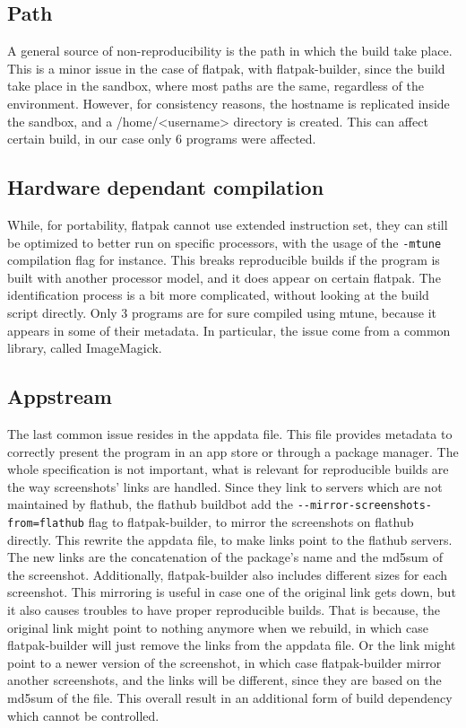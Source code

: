 \documentclass[a4paper,11pt,oneside]{report}
\theoremstyle{definition}
\newcommand{\rb}{reproducible builds\xspace}
\newcommand{\fp}{flatpak\xspace}
\newcommand{\fh}{flathub\xspace}
\newcommand{\fb}{flatpak-builder\xspace}
\newcommand{\fhbb}{flathub buildbot\xspace}
\begin{document}
\subsection*{Path}
A general source of non-reproducibility is the path in which the build take
place. This is a minor issue in the case of \fp, with \fb, since the build take
place in the sandbox, where most paths are the same, regardless of the
environment. However, for consistency reasons, the hostname is replicated
inside the sandbox, and a /home/<username> directory is created. This can
affect certain build, in our case only 6 programs were affected.

\subsection*{Hardware dependant compilation}
While, for portability, \fp cannot use extended instruction set, they can still
be optimized to better run on specific processors, with the usage of the
\verb|-mtune| compilation flag for instance. This breaks \rb if the program is
built with another processor model, and it does appear on certain \fp. The
identification process is a bit more complicated, without looking at the build
script directly. Only 3 programs are for sure compiled using mtune, because it
appears in some of their metadata. In particular, the issue come from a common
library, called ImageMagick.

\subsection*{Appstream}
The last common issue resides in the appdata file. This file provides metadata
to correctly present the program in an app store or through a package manager.
The whole specification is not important, what is relevant for \rb are the way
screenshots' links are handled. Since they link to servers which are not
maintained by \fh, the \fhbb add the \verb|--mirror-screenshots-from=flathub|
flag to \fb, to mirror the screenshots on \fh directly. This rewrite the
appdata file, to make links point to the \fh servers. The new links are the
concatenation of the package's name and the md5sum of the screenshot.
Additionally, \fb also includes different sizes for each screenshot. This
mirroring is useful in case one of the original link gets down, but it also
causes troubles to have proper \rb. That is because, the original link might
point to nothing anymore when we rebuild, in which case \fb will just remove
the links from the appdata file. Or the link might point to a newer version of
the screenshot, in which case \fb mirror another screenshots, and the links
will be different, since they are based on the md5sum of the file. This overall
result in an additional form of build dependency which cannot be controlled.
\end{document}

